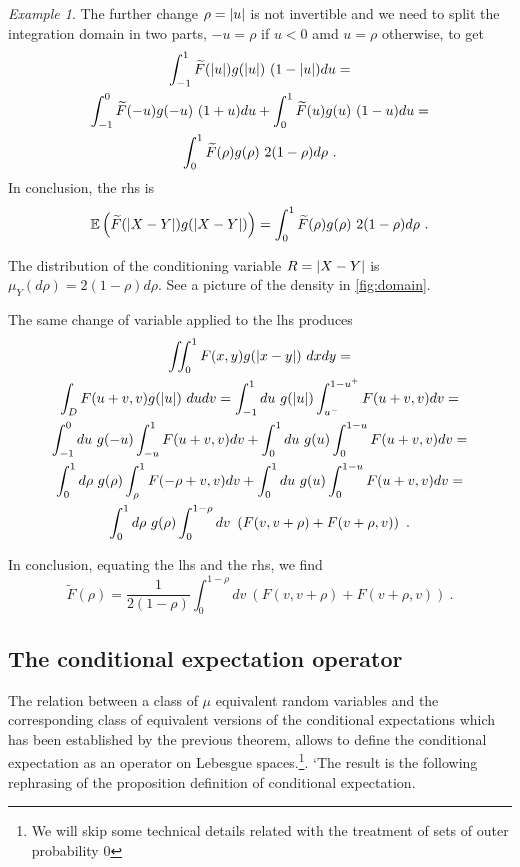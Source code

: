 \documentclass[12pt,a4paper]{amsart}
\theoremstyle{plain}%
\theoremstyle{definition}
\theoremstyle{remark}
\newtheorem{example}{Example}
\begin{document}
\begin{example}
The further change $\rho = \left\vert u\right\vert$ is not invertible and we need to
split the integration domain in two parts, $-u = \rho$ if $u <0$ amd
$u = \rho$ otherwise, to get
\begin{multline*}
\int_{-1}^1 \widetilde F(\left\vert u\right\vert)
  g(\left\vert u\right\vert) \ (1-\left\vert u\right\vert) du = \\ \int_{-1}^0 \widetilde F(- u)
  g(- u) \ (1+u) du + \int_0^1 \widetilde F(u)
  g(u) \ (1-u) du = \\  \int_0^1 \widetilde F(\rho)
  g(\rho) \ 2(1-\rho) d\rho \ .
\end{multline*}
In conclusion, the rhs is
\begin{equation*}
  \operatorname{\mathbb E}\left(\widetilde
  F(\left\vert X-Y\right\vert)g(\left\vert X-Y\right\vert)\right) = \int_0^1 \widetilde F(\rho)
  g(\rho) \ 2(1-\rho) d\rho \ . 
\end{equation*}

The distribution of the conditioning variable $R = \left\vert X-Y\right\vert$ is
$\mu_Y(d\rho) = 2(1-\rho) d\rho$. See a picture of the density in \cref{fig:domain}.

The same change of variable applied to the lhs produces
\begin{multline*}
  \iint_0^1 F(x,y)g(\left\vert x-y\right\vert) \ dx dy = \\ \int_D F(u+v,v)
  g(\left\vert u\right\vert) \ du dv = \int_{-1}^1 du \ g(\left\vert u\right\vert)
  \int_{u^-}^{1-u^+} F(u+v,v) dv = \\ \int_{-1}^0 du \ g(-u)
  \int_{-u}^{1} F(u+v,v) dv + \int_0^1 du \ g(u)
  \int_0^{1-u} F(u+v,v) dv = \\
  \int_0^1 d\rho \ g(\rho)
  \int_{\rho}^{1} F(-\rho+v,v) dv + \int_0^1 du \ g(u)
  \int_0^{1-u} F(u+v,v) dv = \\
\int_0^1 d\rho \ g(\rho) \int_0^{1-\rho} dv \
\left(F(v,v+\rho)+F(v+\rho,v)\right) \ .\end{multline*}
\end{example}

In conclusion, equating the lhs and the rhs, we find
\begin{equation*}
  \widetilde F(\rho) = \frac1{2(1-\rho)} \int_0^{1-\rho} dv \
\left(F(v,v+\rho)+F(v+\rho,v)\right) \ . 
\end{equation*}

\subsection{The conditional expectation operator}

The relation between a class of $\mu$ equivalent random variables and
the corresponding class of equivalent versions of the conditional
expectations which has been established by the previous theorem,
allows to define the conditional expectation as an operator on
Lebesgue spaces.\footnote{We will skip some technical details related
  with the treatment of sets of outer probability 0}. `The result is
the following rephrasing of the proposition definition of conditional
expectation.
\end{document}
